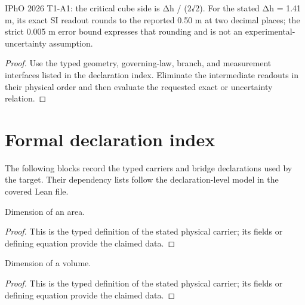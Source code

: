 \begin{theorem}
  \label{thm:physics:IPhO_2026_1_A_1:target}
  IPhO 2026 T1-A1: the critical cube side is Δh / (2√2). For the stated Δh = 1.41 m, its exact SI readout rounds to the reported 0.50 m at two decimal places; the strict 0.005 m error bound expresses that rounding and is not an experimental-uncertainty assumption.
\end{theorem}
\begin{proof}
  Use the typed geometry, governing-law, branch, and measurement interfaces listed in the declaration index.  Eliminate the intermediate readouts in their physical order and then evaluate the requested exact or uncertainty relation.
\end{proof}
\section*{Formal declaration index}
The following blocks record the typed carriers and bridge declarations used by the target.  Their dependency lists follow the declaration-level model in the covered Lean file.

\begin{definition}
  \label{def:physics:IPhO_2026_1_A_1:aux001}
  Dimension of an area.
\end{definition}
\begin{proof}
  This is the typed definition of the stated physical carrier; its fields or defining equation provide the claimed data.
\end{proof}

\begin{definition}
  \label{def:physics:IPhO_2026_1_A_1:aux002}
  Dimension of a volume.
\end{definition}
\begin{proof}
  This is the typed definition of the stated physical carrier; its fields or defining equation provide the claimed data.
\end{proof}

